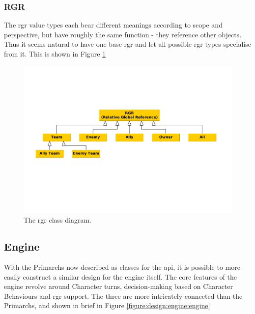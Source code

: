 \subsubsection*{RGR}
The \ac{rgr} value types each bear different meanings according to scope and perspective, but have roughly the same function - they reference other objects. Thus it seems natural to have one base \ac{rgr} and let all possible \ac{rgr} types specialise from it. This is shown in Figure \ref{figure:language:engine:rgr}

\begin{figure}[!h]
\centering
\includegraphics[scale=.4, clip=true, trim=0cm 8cm 0cm 6cm]{img/rgr_class_diagram}
\caption{\label{figure:language:engine:rgr}The \ac{rgr} class diagram.}
\end{figure}

\subsection{Engine}
With the Primarchs now described as classes for the \ac{api}, it is possible to more easily construct a similar design for the engine itself. The core features of the engine revolve around Character turns, decision-making based on Character Behaviours and \ac{rgr} support. The three are more intricately connected than the Primarchs, and shown in brief in Figure \vref{figure:design:engine:engine}

